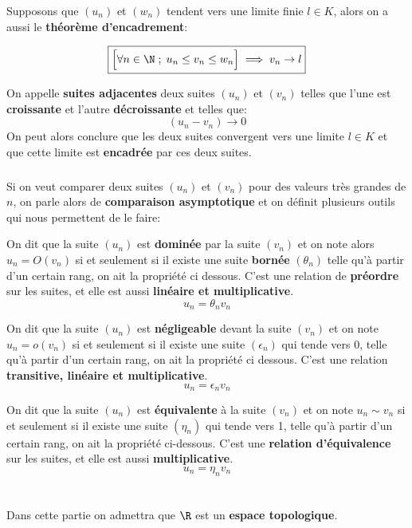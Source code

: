 Supposons que \((u_n)\) et \((w_n)\) tendent vers une limite finie \(l \in K\), alors on a aussi le \textbf{théorème d'encadrement}:

\[
    \boxed{
            \Bigr[\forall n \in \N \; ; \; u_n \leq v_n \leq w_n \Bigr] \implies v_n \rightarrow l
    }
\]

On appelle \textbf{suites adjacentes} deux suites \((u_n)\) et \((v_n)\) telles que l'une est \textbf{croissante} et l'autre \textbf{décroissante} et telles que:
\[
    (u_n - v_n) \rightarrow 0
\]
On peut alors conclure que les deux suites convergent vers une limite \(l \in K\) et que cette limite est \textbf{encadrée} par ces deux suites.

\subsection*{}
Si on veut comparer deux suites \((u_n)\) et \((v_n)\) pour des valeurs très grandes de \(n\), on parle alors de \textbf{comparaison asymptotique} et on définit plusieurs outils qui nous permettent de le faire:\<

On dit que la suite \((u_n)\) est \textbf{dominée} par la suite \((v_n)\) et on note alors \(u_n = O(v_n)\) si et seulement si il existe une suite \textbf{bornée} \((\theta_n)\) telle qu'à partir d'un certain rang, on ait la propriété ci dessous.\+
C'est une relation de \textbf{préordre} sur les suites, et elle est aussi \textbf{linéaire et multiplicative}.
\[
    u_n = \theta_n v_n
\]


On dit que la suite \((u_n)\) est \textbf{négligeable} devant la suite \((v_n)\) et on note \(u_n = o(v_n)\) si et seulement si il existe une suite \((\epsilon_n)\) qui tende vers 0, telle qu'à partir d'un certain rang, on ait la propriété ci dessous.\+
C'est une relation \textbf{transitive, linéaire et multiplicative}.
\[
    u_n = \epsilon_n v_n
\]

On dit que la suite \((u_n)\) est \textbf{équivalente} à la suite \((v_n)\) et on note \(u_n \sim v_n\) si et seulement si il existe une suite \((\eta_n)\) qui tende vers 1, telle qu'à partir d'un certain rang, on ait la propriété ci-dessous.\+ 
C'est une \textbf{relation d'équivalence} sur les suites, et elle est aussi \textbf{multiplicative}. 
\[
    u_n = \eta_n v_n
\]

\chapter*{}
Dans cette partie on admettra que \(\R\) est un \textbf{espace topologique}.

